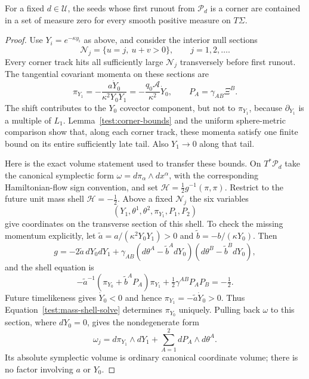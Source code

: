 \begin{proposition}
\label{test:corner-null}
For a fixed $d\in\mathcal U$, the seeds whose first runout from
$\mathcal P_d$ is a corner are contained in a set of measure zero
for every smooth positive measure on $T\Sigma$.
\end{proposition}

\begin{proof}
Use $Y_i=e^{-\kappa y_i}$ as above, and consider the interior null
sections
\[
 \mathcal N_j=\{u=j,\ u+v>0\},\qquad j=1,2,\ldots.
\]
Every corner track hits all sufficiently large $\mathcal N_j$
transversely before first runout. The tangential covariant momenta
on these sections are
\begin{equation}\label{test:section-momenta}
 \pi_{Y_1}=-\frac{a\dot Y_0}{\kappa^2Y_0Y_1}
       =-\frac{q_0\mathcal A}{\kappa^2}\dot Y_0,
 \qquad P_A=\gamma_{AB}\Xi^B.
\end{equation}
The shift contributes to the $Y_0$ covector component, but not to
$\pi_{Y_1}$, because $\partial_{Y_1}$ is a multiple of $L_1$.
Lemma~\ref{test:corner-bounds} and the uniform sphere-metric
comparison show that, along each corner track, these momenta satisfy
one finite bound on its entire sufficiently late tail. Also
$Y_1\to0$ along that tail.

Here is the exact volume statement used to transfer these bounds.
On $T^*\mathcal P_d$ take the canonical symplectic form
$\omega=d\pi_\alpha\wedge dx^\alpha$, with the corresponding
Hamiltonian-flow sign convention, and set
$\mathcal H=\tfrac12g^{-1}(\pi,\pi)$. Restrict to the future
unit mass shell $\mathcal H=-\tfrac12$. Above a fixed
$\mathcal N_j$ the six variables
\[
 (Y_1,\theta^1,\theta^2,\pi_{Y_1},P_1,P_2)
\]
give coordinates on the transverse section of this shell. To check
the missing momentum explicitly, let
$\widetilde a=a/(\kappa^2Y_0Y_1)>0$ and
$\widetilde b=-b/(\kappa Y_0)$. Then
\[
 g=-2\widetilde a\,dY_0dY_1+
 \gamma_{AB}(d\theta^A-\widetilde b^A dY_0)
             (d\theta^B-\widetilde b^B dY_0),
\]
and the shell equation is
\begin{equation}\label{test:mass-shell-solve}
 -\widetilde a^{-1}
       (\pi_{Y_0}+\widetilde b^AP_A)\pi_{Y_1}
       +\tfrac12\gamma^{AB}P_AP_B=-\tfrac12.
\end{equation}
Future timelikeness gives $\dot Y_0<0$ and hence
$\pi_{Y_1}=-\widetilde a\dot Y_0>0$. Thus
Equation~\eqref{test:mass-shell-solve} determines
$\pi_{Y_0}$ uniquely. Pulling back $\omega$ to this section,
where $dY_0=0$, gives the nondegenerate form
\begin{equation}\label{test:section-form}
 \omega_j=d\pi_{Y_1}\wedge dY_1
              +\sum_{A=1}^2dP_A\wedge d\theta^A.
\end{equation}
Its absolute symplectic volume is ordinary canonical coordinate
volume; there is no factor involving $a$ or $Y_0$.


\end{proof}
